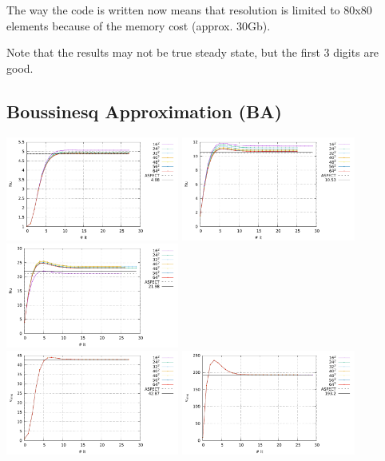 The way the code is written now means that resolution is limited to 80x80 elements 
because of the memory cost (approx. 30Gb).

Note that the \aspect results may not be true steady state, but the first 3 digits are good.

\newpage
\subsection*{Boussinesq Approximation (BA)}

\begin{center}
\includegraphics[width=5.7cm]{python_codes/fieldstone_110/results_BA/Nu_Ra1e4.pdf}
\includegraphics[width=5.7cm]{python_codes/fieldstone_110/results_BA/Nu_Ra1e5.pdf}
\includegraphics[width=5.7cm]{python_codes/fieldstone_110/results_BA/Nu_Ra1e6.pdf}\\
\includegraphics[width=5.7cm]{python_codes/fieldstone_110/results_BA/vrms_Ra1e4.pdf}
\includegraphics[width=5.7cm]{python_codes/fieldstone_110/results_BA/vrms_Ra1e5.pdf}

\end{center}
